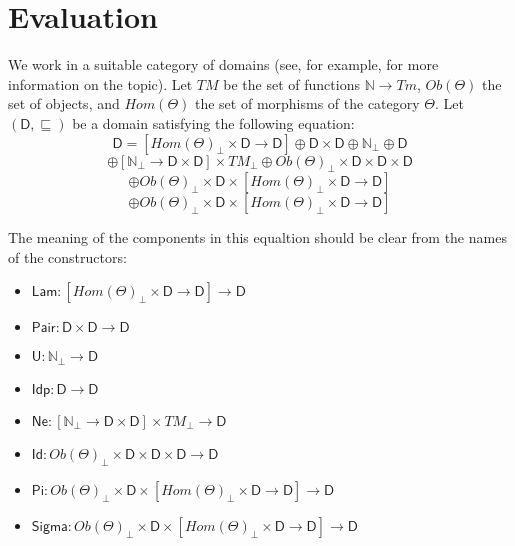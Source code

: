 \documentclass{amsart}
\theoremstyle{definition}
\theoremstyle{remark}
\newcommand{\D}{\mathsf{D}}
\newcommand{\nats}{\mathbb{N}}
\numberwithin{table}{section}
\begin{document}
\section{Evaluation}
\label{sec:eval}

We work in a suitable category of domains (see, for example, \cite{domains} for more information on the topic).
Let $TM$ be the set of functions $\nats \to Tm$, $Ob(\Theta)$ the set of objects, and $Hom(\Theta)$ the set of morphisms of the category $\Theta$.
Let $(\D,\sqsubseteq)$ be a domain satisfying the following equation:
\[ \D = [Hom(\Theta)_\bot \times \D \to \D] \oplus \D \times \D \oplus \nats_\bot \oplus \D \]
\[ \oplus [\nats_\bot \to \D \times \D] \times TM_\bot \oplus Ob(\Theta)_\bot \times \D \times \D \times \D \]
\[ \oplus Ob(\Theta)_\bot \times \D \times [Hom(\Theta)_\bot \times \D \to \D] \]
\[ \oplus Ob(\Theta)_\bot \times \D \times [Hom(\Theta)_\bot \times \D \to \D] \]

The meaning of the components in this equaltion should be clear from the names of the constructors:
\begin{itemize}
\item[] $\mathsf{Lam} : [Hom(\Theta)_\bot \times \D \to \D] \to \D$
\item[] $\mathsf{Pair} : \D \times \D \to \D$
\item[] $\mathsf{U} : \nats_\bot \to \D$
\item[] $\mathsf{Idp} : \D \to \D$
\item[] $\mathsf{Ne} : [\nats_\bot \to \D \times \D] \times TM_\bot \to \D$
\item[] $\mathsf{Id} : Ob(\Theta)_\bot \times \D \times \D \times \D \to \D$
\item[] $\mathsf{Pi} : Ob(\Theta)_\bot \times \D \times [Hom(\Theta)_\bot \times \D \to \D] \to \D$
\item[] $\mathsf{Sigma} : Ob(\Theta)_\bot \times \D \times [Hom(\Theta)_\bot \times \D \to \D] \to \D$
\end{itemize}
\end{document}
